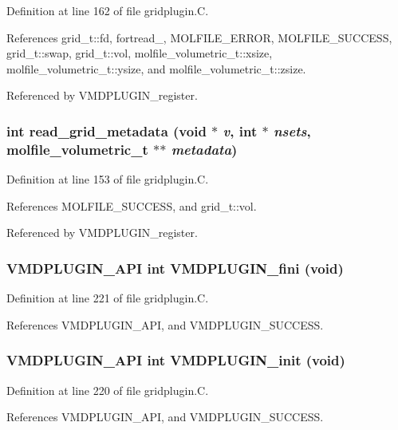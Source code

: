 Definition at line 162 of file gridplugin.C.

References grid\_\-t::fd, fortread\_, MOLFILE\_\-ERROR, MOLFILE\_\-SUCCESS, grid\_\-t::swap, grid\_\-t::vol, molfile\_\-volumetric\_\-t::xsize, molfile\_\-volumetric\_\-t::ysize, and molfile\_\-volumetric\_\-t::zsize.

Referenced by VMDPLUGIN\_\-register.
\subsubsection{\setlength{\rightskip}{0pt plus 5cm}int read\_\-grid\_\-metadata (void $\ast$ {\em v}, int $\ast$ {\em nsets}, {\bf molfile\_\-volumetric\_\-t} $\ast$$\ast$ {\em metadata})\hspace{0.3cm}{\tt  [static]}}\label{gridplugin_8C_a2}




Definition at line 153 of file gridplugin.C.

References MOLFILE\_\-SUCCESS, and grid\_\-t::vol.

Referenced by VMDPLUGIN\_\-register.
\subsubsection{\setlength{\rightskip}{0pt plus 5cm}VMDPLUGIN\_\-API int VMDPLUGIN\_\-fini (void)}\label{gridplugin_8C_a6}




Definition at line 221 of file gridplugin.C.

References VMDPLUGIN\_\-API, and VMDPLUGIN\_\-SUCCESS.
\subsubsection{\setlength{\rightskip}{0pt plus 5cm}VMDPLUGIN\_\-API int VMDPLUGIN\_\-init (void)}\label{gridplugin_8C_a5}




Definition at line 220 of file gridplugin.C.

References VMDPLUGIN\_\-API, and VMDPLUGIN\_\-SUCCESS.
